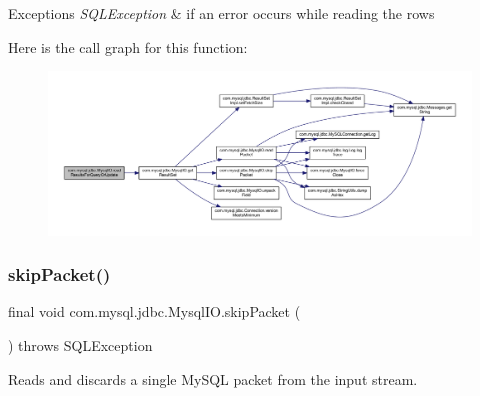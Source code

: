 \begin{DoxyExceptions}{Exceptions}
{\em S\+Q\+L\+Exception} & if an error occurs while reading the rows \\
\hline
\end{DoxyExceptions}
Here is the call graph for this function\+:
\nopagebreak
\begin{figure}[H]
\begin{center}
\leavevmode
\includegraphics[width=350pt]{classcom_1_1mysql_1_1jdbc_1_1_mysql_i_o_ae581885b9b18704a97106cc0992d1893_cgraph}
\end{center}
\end{figure}
\mbox{\label{classcom_1_1mysql_1_1jdbc_1_1_mysql_i_o_a9b5ceba1f2420b68450dd1f8ae9ad53a}} 
\subsubsection{\texorpdfstring{skip\+Packet()}{skipPacket()}}
{\footnotesize\ttfamily final void com.\+mysql.\+jdbc.\+Mysql\+I\+O.\+skip\+Packet (\begin{DoxyParamCaption}{ }\end{DoxyParamCaption}) throws S\+Q\+L\+Exception\hspace{0.3cm}{\ttfamily [protected]}}

Reads and discards a single My\+S\+QL packet from the input stream.


